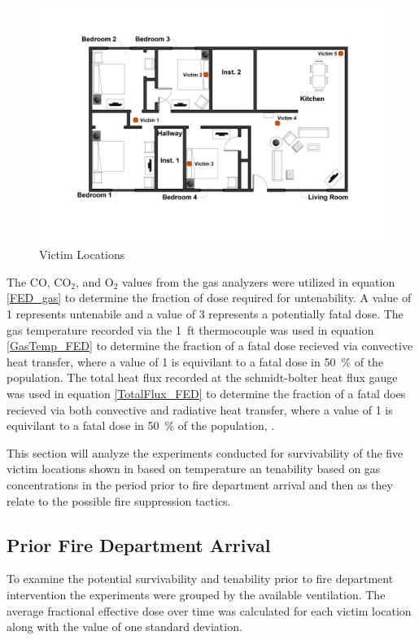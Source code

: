 \documentclass[12pt,oneside]{book}
\begin{document}
\begin{figure}[H]
	\centering
	\includegraphics[width=\textwidth]{../0_Images/Victim_Locations}
	\caption{Victim Locations}
	\label{fig:vic_loc}
\end{figure}

The CO, CO$_{2}$, and O$_{2}$ values from the gas analyzers were utilized in equation \ref{FED_gas} to determine the fraction of dose required for untenability. A value of 1 represents untenabile and a value of 3 represents a potentially fatal dose. The gas temperature recorded via the 1~ft thermocouple was used in equation \ref{GasTemp_FED} to determine the fraction of a fatal dose recieved via convective heat transfer, where a value of 1 is equivilant to a fatal dose in 50~\% of the population. The total heat flux recorded at the  schmidt-bolter heat flux gauge was used in equation \ref{TotalFlux_FED} to determine the fraction of a fatal does recieved via both convective and radiative heat transfer, where a value of 1 is equivilant to a fatal dose in 50~\% of the population, .  

This section will analyze the experiments conducted for survivability of the five victim locations shown in  based on temperature an tenability based on gas concentrations in the period prior to fire department arrival and then as they relate to the possible fire suppression tactics. 

\subsection{Prior Fire Department Arrival}
To examine the potential survivability and tenability prior to fire department intervention the experiments were grouped by the available ventilation. The average fractional effective dose over time was calculated for each victim location along with the value of one standard deviation. 
\end{document}
